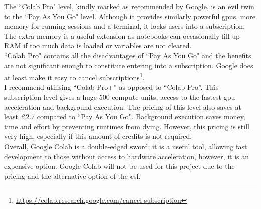 The ``Colab Pro" level, kindly marked as recommended by Google, is an evil twin to the ``Pay As You Go" level. Although it provides similarly powerful \acrshort{gpu}s, more memory for running sessions and a terminal, it locks users into a subscription. The extra memory is a useful extension as notebooks can occasionally fill up RAM if too much data is loaded or variables are not cleared.\\
``Colab Pro" contains all the disadvantages of ``Pay As You Go" and the benefits are not significant enough to constitute entering into a subscription. Google does at least make it easy to cancel subscriptions\footnote{\url{https://colab.research.google.com/cancel-subscription}}.\\
I recommend utilising “Colab Pro+” as opposed to “Colab Pro”. This subscription level gives a huge 500 compute units, access to the fastest \acrshort{gpu} acceleration and background execution. The pricing of this level also saves at least £2.7 compared to ``Pay As You Go". Background execution saves money, time and effort by preventing runtimes from dying. However, this pricing is still very high, especially if this amount of credits is not required.\\
Overall, Google Colab is a double-edged sword; it is a useful tool, allowing fast development to those without access to hardware acceleration, however, it is an expensive option. Google Colab will not be used for this project due to the pricing and the alternative option of the \acrshort{csf}.\\
